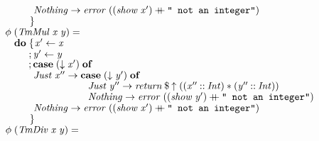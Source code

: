 \documentclass[10pt]{article}
\newcommand{\Conid}[1]{\mathit{#1}}
\newcommand{\Varid}[1]{\mathit{#1}}
\newcommand{\plus}{\mathbin{+\!\!\!+}}
\begin{document}
\begin{tabbing}
${\hskip1.00em\relax\hskip2.00em\relax\phantom{\Varid{\phi}\;\mbox{}}\phantom{\mathbf{do}\;\mbox{}}\phantom{;\mbox{}}\Conid{Nothing}\to \Varid{error}\;((\Varid{show}\;\Varid{x'})\plus \text{\tt \char34 ~not~an~integer\char34})}$\\
${\hskip1.00em\relax\hskip2.00em\relax\phantom{\Varid{\phi}\;\mbox{}}\phantom{\mathbf{do}\;\mbox{}}\mskip1.5mu\}}$\\
${}$\\
${\hskip1.00em\relax\hskip2.00em\relax\Varid{\phi}\;(\Conid{TmMul}\;\Varid{x}\;\Varid{y})\mathrel{=}}$\\
${\hskip1.00em\relax\hskip2.00em\relax\phantom{\Varid{\phi}\;\mbox{}}\mathbf{do}\;\{\mskip1.5mu \Varid{x'}\leftarrow \Varid{x}}$\\
${\hskip1.00em\relax\hskip2.00em\relax\phantom{\Varid{\phi}\;\mbox{}}\phantom{\mathbf{do}\;\mbox{}};\Varid{y'}\leftarrow \Varid{y}}$\\
${\hskip1.00em\relax\hskip2.00em\relax\phantom{\Varid{\phi}\;\mbox{}}\phantom{\mathbf{do}\;\mbox{}};\mathbf{case}\;(\Varid{\downarrow}\;\Varid{x'})\;\mathbf{of}}$\\
${\hskip1.00em\relax\hskip2.00em\relax\phantom{\Varid{\phi}\;\mbox{}}\phantom{\mathbf{do}\;\mbox{}}\phantom{;\mbox{}}\Conid{Just}\;\Varid{x''}\to \mathbf{case}\;(\Varid{\downarrow}\;\Varid{y'})\;\mathbf{of}}$\\
${\hskip1.00em\relax\hskip2.00em\relax\phantom{\Varid{\phi}\;\mbox{}}\phantom{\mathbf{do}\;\mbox{}}\phantom{;\mbox{}}\hskip5.50em\relax\Conid{Just}\;\Varid{y''}\to \Varid{return}\mathbin{\$}\Varid{\uparrow}\;((\Varid{x''}\mathbin{::}\Conid{Int})\mathbin{*}(\Varid{y''}\mathbin{::}\Conid{Int}))}$\\
${\hskip1.00em\relax\hskip2.00em\relax\phantom{\Varid{\phi}\;\mbox{}}\phantom{\mathbf{do}\;\mbox{}}\phantom{;\mbox{}}\hskip5.50em\relax\Conid{Nothing}\to \Varid{error}\;((\Varid{show}\;\Varid{y'})\plus \text{\tt \char34 ~not~an~integer\char34})}$\\
${\hskip1.00em\relax\hskip2.00em\relax\phantom{\Varid{\phi}\;\mbox{}}\phantom{\mathbf{do}\;\mbox{}}\phantom{;\mbox{}}\Conid{Nothing}\to \Varid{error}\;((\Varid{show}\;\Varid{x'})\plus \text{\tt \char34 ~not~an~integer\char34})}$\\
${\hskip1.00em\relax\hskip2.00em\relax\phantom{\Varid{\phi}\;\mbox{}}\phantom{\mathbf{do}\;\mbox{}}\mskip1.5mu\}}$\\
${}$\\
${\hskip1.00em\relax\hskip2.00em\relax\Varid{\phi}\;(\Conid{TmDiv}\;\Varid{x}\;\Varid{y})\mathrel{=}}$\\

\end{tabbing}
\end{document}
